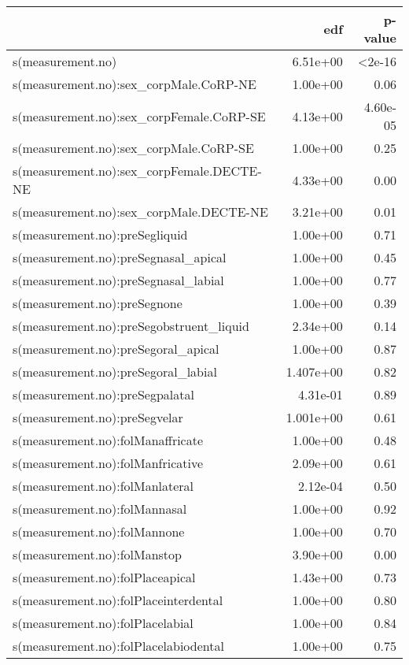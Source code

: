 \documentclass[../../../00.FullDoc/tex/Thesis]{subfiles}
\begin{document}
\begin{table}[htbp]
	\centering
	\begin{tabular}{lrr}
		\hline
		& edf & p-value \\
		\hline
		s(measurement.no) & 6.51e+00 & <2e-16 \\
		s(measurement.no):sex\_corpMale.CoRP-NE & 1.00e+00 & 0.06 \\
		s(measurement.no):sex\_corpFemale.CoRP-SE & 4.13e+00 & 4.60e-05 \\
		s(measurement.no):sex\_corpMale.CoRP-SE & 1.00e+00 & 0.25 \\
		s(measurement.no):sex\_corpFemale.DECTE-NE & 4.33e+00 & 0.00 \\
		s(measurement.no):sex\_corpMale.DECTE-NE & 3.21e+00 & 0.01 \\
		s(measurement.no):preSegliquid & 1.00e+00 & 0.71 \\
		s(measurement.no):preSegnasal\_apical & 1.00e+00 & 0.45 \\
		s(measurement.no):preSegnasal\_labial & 1.00e+00 & 0.77 \\
		s(measurement.no):preSegnone & 1.00e+00 & 0.39 \\
		s(measurement.no):preSegobstruent\_liquid & 2.34e+00 & 0.14 \\
		s(measurement.no):preSegoral\_apical & 1.00e+00 & 0.87 \\
		s(measurement.no):preSegoral\_labial & 1.407e+00 & 0.82 \\
		s(measurement.no):preSegpalatal & 4.31e-01 & 0.89 \\
		s(measurement.no):preSegvelar & 1.001e+00 & 0.61 \\
		s(measurement.no):folManaffricate & 1.00e+00 & 0.48 \\
		s(measurement.no):folManfricative & 2.09e+00 & 0.61 \\
		s(measurement.no):folManlateral & 2.12e-04 & 0.50 \\
		s(measurement.no):folMannasal & 1.00e+00 & 0.92 \\
		s(measurement.no):folMannone & 1.00e+00 & 0.70 \\
		s(measurement.no):folManstop & 3.90e+00 & 0.00 \\
		s(measurement.no):folPlaceapical & 1.43e+00 & 0.73 \\
		s(measurement.no):folPlaceinterdental & 1.00e+00 & 0.80 \\
		s(measurement.no):folPlacelabial & 1.00e+00 & 0.84 \\
		s(measurement.no):folPlacelabiodental & 1.00e+00 & 0.75 \\

\end{tabular}
\end{table}
\end{document}
